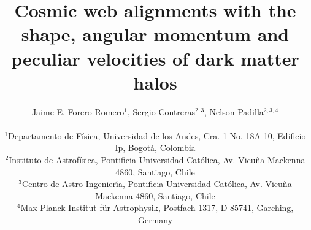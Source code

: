 \documentclass[useAMS,usenatbib]{mn2e}
\begin{document}
\title[Halo alignments with the cosmic web]{Cosmic web alignments with
  the shape, angular momentum and peculiar velocities of dark matter
  halos}  
\author[J.E. Forero-Romero et al.]{
\parbox[t]{\textwidth}{\raggedright
  Jaime E. Forero-Romero$^{1}$,
  Sergio Contreras$^{2,3}$,
  Nelson Padilla$^{2,3,4}$
}
\vspace*{6pt}\\
$^{1}$Departamento de F\'{i}sica, Universidad de los Andes, Cra. 1
No. 18A-10, Edificio Ip, Bogot\'a, Colombia\\
$^{2}$Instituto de Astrofísica, Pontificia Universidad Cat\'olica,
Av. Vicu\~na Mackenna 4860, Santiago, Chile\\
$^{3}$Centro de Astro-Ingenier\'\i a, Pontificia Universidad Cat\'olica,
Av. Vicu\~na Mackenna 4860, Santiago, Chile\\
$^{4}$Max Planck Institut f\"ur Astrophysik, Postfach 1317, D-85741, Garching, Germany\\
}
\maketitle
\end{document}
